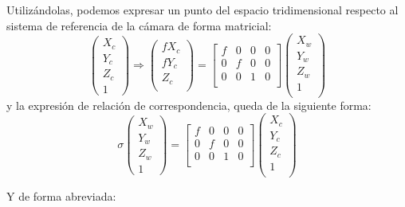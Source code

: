 Utilizándolas, podemos expresar un punto del espacio tridimensional respecto al sistema de referencia de la cámara de forma matricial:
\begin{equation} 
\begin{pmatrix}
    X_{c} \\
    Y_{c} \\
    Z_{c} \\
    1
  \end{pmatrix}
  \Longrightarrow
  \begin{pmatrix}
    fX_{c} \\
    fY_{c} \\
    Z_{c} \\
  \end{pmatrix}
  =
  \begin{bmatrix} f & 0 & 0 & 0 \\ 0 & f & 0 & 0 \\ 0 & 0 & 1 & 0 \\\end{bmatrix}
  \begin{pmatrix} X_{w} \\  Y_{w} \\  Z_{w} \\  1 \\\end{pmatrix}
\end{equation}
y la expresión de relación de correspondencia, queda de la siguiente forma:
\begin{equation} 
\sigma
\begin{pmatrix}
    X_{w} \\
    Y_{w} \\
    Z_{w} \\
    1
  \end{pmatrix}
=
  \begin{bmatrix} f & 0 & 0 & 0 \\ 0 & f & 0 & 0 \\ 0 & 0 & 1 & 0 \\\end{bmatrix}
  \begin{pmatrix} X_{c} \\  Y_{c} \\  Z_{c} \\  1 \\\end{pmatrix}
\end{equation}

Y de forma abreviada:

